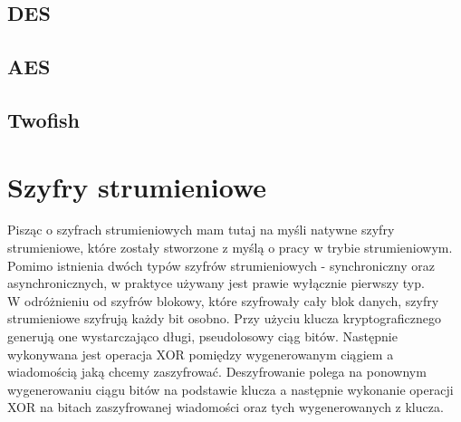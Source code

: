 \subsection{DES}
\subsection{AES}
\subsection{Twofish}

\section{Szyfry strumieniowe}
Pisząc o szyfrach strumieniowych mam tutaj na myśli natywne szyfry strumieniowe, które zostały stworzone z myślą o pracy w trybie strumieniowym. 
Pomimo istnienia dwóch typów szyfrów strumieniowych - synchroniczny oraz asynchronicznych, w praktyce używany jest prawie wyłącznie pierwszy typ. \\
W odróżnieniu od szyfrów blokowy, które szyfrowały cały blok danych, szyfry strumieniowe szyfrują każdy bit osobno. 
Przy użyciu klucza kryptograficznego generują one wystarczająco długi, pseudolosowy ciąg bitów. 
Następnie wykonywana jest operacja XOR pomiędzy wygenerowanym ciągiem a wiadomością jaką chcemy zaszyfrować. 
Deszyfrowanie polega na ponownym wygenerowaniu ciągu bitów na podstawie klucza a następnie wykonanie operacji XOR na bitach zaszyfrowanej wiadomości oraz tych wygenerowanych z klucza.

